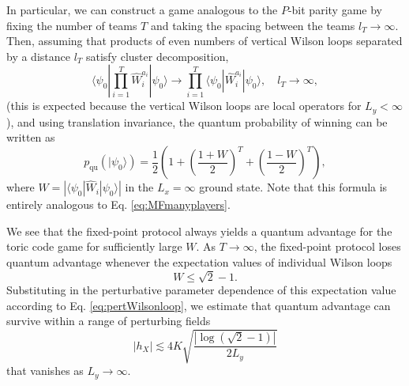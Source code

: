 \documentclass[prb,twocolumn,showpacs,amssymb,superscriptaddress]{revtex4-2}
\begin{document}
In particular, we can construct a game analogous to the $P$-bit parity game by fixing the number of teams $T$ and taking the spacing between the teams $l_T \to \infty$. Then, assuming that products of even numbers of vertical Wilson loops separated by a distance $l_T$ satisfy cluster decomposition,
\begin{equation}
\langle \psi_0 | \prod_{i=1}^T \hat{W}_i^{a_i} | \psi_0\rangle \to \prod_{i=1}^T \langle \psi_0 |  \hat{W}_i^{a_i} | \psi_0\rangle, \quad l_T \to \infty,
\end{equation}
(this is expected because the vertical Wilson loops are local operators for $L_y < \infty$), and using translation invariance, the quantum probability of winning can be written as
\begin{equation}
p_{\mathrm{qu}}(|\psi_0\rangle) = \frac{1}{2} \left(1 + \left(\frac{1+W }{2}\right)^T +  \left(\frac{1-W}{2}\right)^T \right),
\end{equation}
where $W =|\langle \psi_0 |  \hat{W}_i| \psi_0\rangle|$ in the $L_x = \infty$ ground state. Note that this formula is entirely analogous to Eq. \eqref{eq:MFmanyplayers}.

We see that the fixed-point protocol always yields a quantum advantage for the toric code game for sufficiently large $W$. As $T \to \infty$, the fixed-point protocol loses quantum advantage whenever the expectation values of individual Wilson loops
\begin{equation}
W \leq \sqrt{2} -1.
\end{equation}
Substituting in the perturbative parameter dependence of this expectation value according to Eq. \eqref{eq:pertWilsonloop}, we estimate that quantum advantage can survive within a range of perturbing fields
\begin{equation}
|h_X| \lesssim 4K \sqrt{\frac{|\log(\sqrt{2}-1)|}{2L_y}}
\end{equation}
that vanishes as $L_y \to \infty$.
\end{document}

